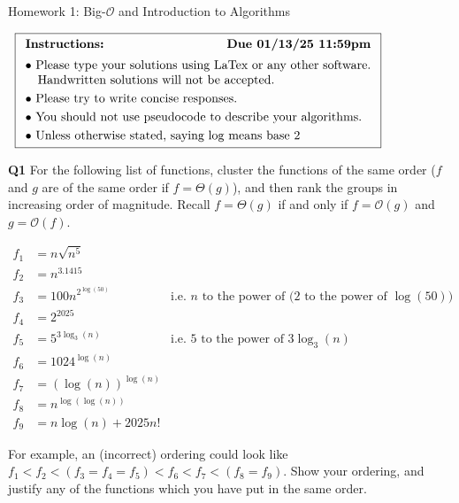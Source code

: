 \documentclass[12pt]{article}
\newcommand{\question}[3][Q]{
\begin{description}
\item \textbf{#1{#2}} #3
\end{description}
}
\renewcommand\maketitle{
\thispagestyle{firstpage}
\begin{center}
\fontsize{20}{0}\selectfont
\assignmentTitle
\end{center}
\begin{center}
$\begin{array}{l}\fbox{$\begin{array}{l}\textbf{Instructions: } \hfill \textbf{Due \dueOn} \\[0.5em] \bullet\ \text{Please type your solutions using LaTex or any other software.} \\ \hspace{1em} \text{Handwritten solutions will not be accepted.} \\[0.3em] \bullet\ \text{Please try to write concise responses.} \\[0.3em]  \bullet\ \text{You should not use pseudocode to describe your algorithms.} \\[0.3em] \bullet\ \text{Unless otherwise stated, saying $\log$ means base 2} \end{array}$} \end{array}$ \end{center}}
\newcommand{\bigO}{\mathcal{O}}
\begin{document}
\newcommand{\assignmentTitle}{Homework 1: Big-$\bigO$ and Introduction to Algorithms}
\newcommand{\dueOn}{01/13/25 11:59pm}












\newcommand{\studentName}{Your name}
\newcommand{\collaborators}{any collaborators}

\maketitle
\newpage

\question{1}{
    For the following list of functions, cluster the functions of the same order ($f$ and $g$ are of the same order if $f = \Theta(g)$), and then rank the groups in increasing order of magnitude. Recall $f = \Theta(g)$ if and only if $f = \bigO(g)$ and $g = \bigO(f)$.

    \begin{align*}
        f_1 &= n\sqrt{n^5}\\
        f_2 &= n^{3.1415}\\
        f_3 &= 100n^{2^{\log(50)}} & \text{i.e. $n$ to the power of ($2$ to the power of $\log(50)$)}\\
        f_4 &= 2^{2025}\\
        f_5 &= 5^{3\log_3(n)} & \text{i.e. 5 to the power of $3\log_3(n)$}\\
        f_6 &= 1024^{\log(n)}\\
        f_7 &= (\log(n))^{\log(n)}\\
        f_8 &= n^{\log(\log(n))}\\
        f_9 &= n\log(n) + 2025n!
    \end{align*}

    For example, an (incorrect) ordering could look like $f_1 < f_2 < (f_3 = f_4 = f_5) < f_6 < f_7 < (f_8 = f_9)$. Show your ordering, and justify any of the functions which you have put in the same order.
}
\end{document}
